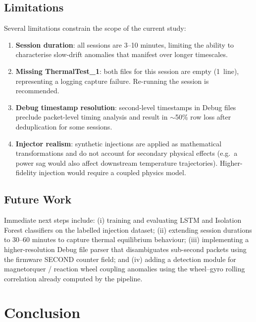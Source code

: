 \documentclass[conference]{IEEEtran}
\begin{document}
\subsection{Limitations}

Several limitations constrain the scope of the current study:

\begin{enumerate}
  \item \textbf{Session duration}: all sessions are 3–10 minutes,
        limiting the ability to characterise slow-drift anomalies
        that manifest over longer timescales.
  \item \textbf{Missing ThermalTest\_1}: both files for this session
        are empty (\SI{1}{line}), representing a logging capture
        failure.  Re-running the session is recommended.
  \item \textbf{Debug timestamp resolution}: second-level timestamps
        in Debug files preclude packet-level timing analysis and
        result in $\sim$50\% row loss after deduplication for some
        sessions.
  \item \textbf{Injector realism}: synthetic injections are applied
        as mathematical transformations and do not account for
        secondary physical effects (e.g.\ a power sag would also
        affect downstream temperature trajectories).  Higher-fidelity
        injection would require a coupled physics model.
\end{enumerate}

\subsection{Future Work}

Immediate next steps include: (i) training and evaluating LSTM and
Isolation Forest classifiers on the labelled injection dataset;
(ii) extending session durations to 30–60 minutes to capture thermal
equilibrium behaviour; (iii) implementing a higher-resolution Debug
file parser that disambiguates sub-second packets using the firmware
SECOND counter field; and (iv) adding a detection module for
magnetorquer / reaction wheel coupling anomalies using the
wheel--gyro rolling correlation already computed by the pipeline.

\section{Conclusion}
\label{sec:conclusion}
\end{document}
